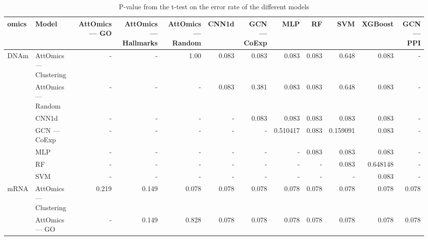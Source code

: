 \begin{landscape}
	\begin{table}
		\tiny
		\centering
		\caption{P-value from the t-test on the error rate of the different models}\label{tab:pval_error_rate}
		\begin{tabular}{llrrrrrrrrrr}
			\toprule
			omics                  & Model                   & AttOmics --- GO & AttOmics --- Hallmarks & AttOmics --- Random & CNN1d & GCN --- CoExp & MLP      & RF    & SVM      & XGBoost  & GCN --- PPI \\
			\midrule
			\multirow{7}{*}{DNAm}  & AttOmics --- Clustering & -               & -                      & 1.00                & 0.083 & 0.083         & 0.083    & 0.083 & 0.648    & 0.083    & -           \\ %
			                       & AttOmics --- Random     & -               & -                      & -                   & 0.083 & 0.381         & 0.083    & 0.083 & 0.648    & 0.083    & -           \\ %
			                       & CNN1d                   & -               & -                      & -                   & -     & 0.083         & 0.083    & 0.083 & 0.083    & 0.083    & -           \\ %
			                       & GCN --- CoExp           & -               & -                      & -                   & -     & -             & 0.510417 & 0.083 & 0.159091 & 0.083    & -           \\ %
			                       & MLP                     & -               & -                      & -                   & -     & -             & -        & 0.083 & 0.083    & 0.083    & -           \\ %
			                       & RF                      & -               & -                      & -                   & -     & -             & -        & -     & 0.083    & 0.648148 & -           \\ %
			                       & SVM                     & -               & -                      & -                   & -     & -             & -        & -     & -        & 0.083    & -           \\ %
			\midrule
			\multirow{10}{*}{mRNA} & AttOmics --- Clustering & 0.219           & 0.149                  & 0.078               & 0.078 & 0.078         & 0.078    & 0.078 & 0.078    & 0.078    & 0.078       \\
			                       & AttOmics --- GO         & -               & 0.149                  & 0.828               & 0.078 & 0.078         & 0.078    & 0.078 & 0.078    & 0.078    & 0.078       \\ %

\end{tabular}
\end{table}
\end{landscape}
